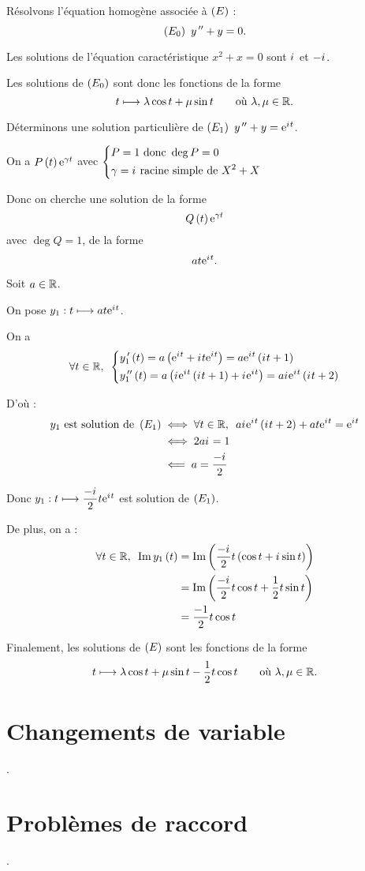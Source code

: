\begin{corr}[3]
Résolvons l'équation homogène associée à \(\left(E\right)\) : \[\left(E_0\right)~y^{\,\prime\prime}+y=0.\]

Les solutions de l'équation caractéristique \(x^2+x=0\) sont \(i\mkern1mu\) et \(-i\mkern1mu\).

Les solutions de \(\left(E_0\right)\) sont donc les fonctions de la forme \[t\longmapsto\lambda\cos t+\mu\sin t\qquad\text{où }\lambda,\mu\in\mathbb{R}.\]

Déterminons une solution particulière de \(\left(E_1\right)~y^{\,\prime\prime}+y=\mathrm{e}^{i\mkern1mu t}\).

\begin{brouill}
On a \(P\left(t\right)\mathrm{e}^{\gamma t}\) avec \(\begin{dcases}
P=1\text{ donc }\deg P=0 \\
\gamma=i\mkern1mu\text{ racine simple de }X^2+X
\end{dcases}\)

Donc on cherche une solution de la forme \[Q\left(t\right)\mathrm{e}^{\gamma t}\] avec \(\deg Q=1\), \cad de la forme \[at\mathrm{e}^{i\mkern1mu t}.\]
\end{brouill}

Soit \(a\in\mathbb{R}\).

On pose \(y_1:t\longmapsto at\mathrm{e}^{i\mkern1mu t}\).

On a \[\quantifs{\forall t\in\R}\begin{dcases}
y_1\prim\paren{t}=a\paren{\e{\i t}+\i t\e{\i t}}=a\e{\i t}\paren{\i t+1} \\
y_1\seconde\paren{t}=a\paren{\i\e{\i t}\paren{\i t+1}+\i\e{\i t}}=a\i\e{\i t}\paren{\i t+2}
\end{dcases}\]

D'où : \[\begin{aligned}
y_1\text{ est solution de }\paren{E_1}&\ssi\quantifs{\forall t\in\R}a\i\e{\i t}\paren{\i t+2}+at\e{\i t}=\e{\i t} \\
&\ssi2a\i=1 \\
&\impr a=\dfrac{-\i}{2}
\end{aligned}\]

Donc \(y_1:t\longmapsto\dfrac{-i\mkern1mu}{2}t\mathrm{e}^{i\mkern1mu t}\) est solution de \(\left(E_1\right)\).

De plus, on a : \[\begin{aligned}
\quantifs{\forall t\in\R}\Im y_1\paren{t}&=\Im\paren{\dfrac{-\i}{2}t\paren{\cos t+\i\sin t}} \\
&=\Im\paren{\dfrac{-\i}{2}t\cos t+\dfrac{1}{2}t\sin t} \\
&=\dfrac{-1}{2}t\cos t
\end{aligned}\]

Finalement, les solutions de \(\left(E\right)\) sont les fonctions de la forme \[t\longmapsto\lambda\cos t+\mu\sin t-\dfrac{1}{2}t\cos t\qquad\text{où }\lambda,\mu\in\mathbb{R}.\]
\end{corr}

\section{Changements de variable}

\Cf {}.

\section{Problèmes de raccord}

\Cf {}.
